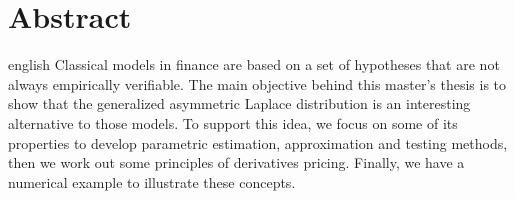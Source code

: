 \chapter*{Abstract}                      %

\begin{otherlanguage*}{english}
  Classical models in finance are based on a set of hypotheses that are not always empirically verifiable. The main objective behind this master's thesis is to show that the generalized asymmetric Laplace distribution is an interesting alternative to those models. To support this idea, we focus on some of its properties to develop parametric estimation, approximation and testing methods, then we work out some principles of derivatives pricing. Finally, we have a numerical example to illustrate these concepts.  
\end{otherlanguage*}

